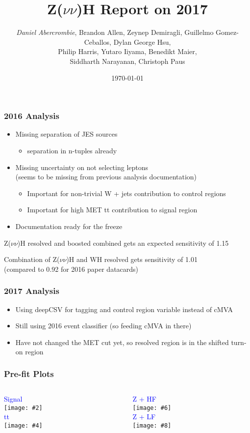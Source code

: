 \documentclass{beamer}
\author[D. Abercrombie]{
  \emph{Daniel Abercrombie}, Brandon Allen, Zeynep Demiragli,
  Guillelmo Gomez-Ceballos, Dylan George Hsu, \\
  Philip Harris, Yutaro Iiyama, Benedikt Maier, \\
  Siddharth Narayanan, Christoph Paus
}
\title{\bf \sffamily Z($\nu\nu$)H Report on 2017}
\date{\today}
\newcommand{\fourfigs}[8]{
  \begin{columns}
    \begin{column}{0.3\linewidth}
      \centering
      \textcolor{blue}{#1} \\
      \texttt{[image: \#2]} \\
      \textcolor{blue}{#3} \\
      \texttt{[image: \#4]}
    \end{column}
    \begin{column}{0.3\linewidth}
      \centering
      \textcolor{blue}{#5} \\
      \texttt{[image: \#6]} \\
      \textcolor{blue}{#7} \\
      \texttt{[image: \#8]}
    \end{column}
  \end{columns}
}
\begin{document}
\begin{frame}[nonumbering]
  \titlepage
\end{frame}

\begin{frame}
  \frametitle{2016 Analysis}
  \begin{itemize}
  \item Missing separation of JES sources
    \begin{itemize}
    \item separation in n-tuples already
    \end{itemize}
  \item Missing uncertainty on not selecting leptons \\
    (seems to be missing from previous analysis documentation)
    \begin{itemize}
    \item Important for non-trivial W + jets contribution to control regions
    \item Important for high MET tt contribution to signal region
    \end{itemize}
  \item Documentation ready for the freeze
  \end{itemize}
  Z($\nu\nu$)H resolved and boosted combined gets an expected sensitivity of 1.15

  \vspace{12pt}

  Combination of Z($\nu\nu$)H and WH resolved gets sensitivity of 1.01 \\
  (compared to 0.92 for 2016 paper datacards)
\end{frame}

\begin{frame}
  \frametitle{2017 Analysis}
  \begin{itemize}
  \item Using deepCSV for tagging and control region variable instead of cMVA
  \item Still using 2016 event classifier (so feeding cMVA in there)
  \item Have not changed the MET cut yet,
    so resolved region is in the shifted turn-on region
  \end{itemize}
\end{frame}

\begin{frame}
  \frametitle{Pre-fit Plots}
  \fourfigs{Signal}
           {180531_class_pre/inclusive_signal_event_class.pdf}
           {tt}
           {180531_v2/inclusive_tt_jet2_deepCSVb.pdf}
           {Z + HF}
           {180531_v2/inclusive_heavyz_jet2_deepCSVb.pdf}
           {Z + LF}
           {180531_v2/inclusive_lightz_jet2_deepCSVb.pdf}
\end{frame}
\end{document}

